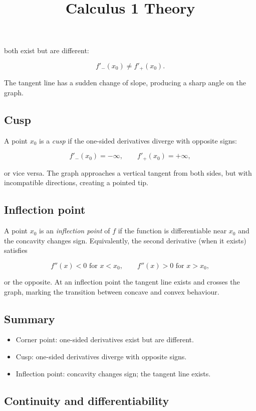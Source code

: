\documentclass[11pt,a4paper]{article} \usepackage[T1]{fontenc}
\theoremstyle{plain} \newtheorem{theorem}{Theorem} \title{Calculus 1 Theory}
\begin{document}
both exist but are different:

\[
f'_-(x_0) \neq f'_+(x_0).
\]

The tangent line has a sudden change of slope, producing a sharp angle on the
graph.

\subsection*{Cusp}

A point $x_0$ is a \emph{cusp} if the one-sided derivatives diverge with
opposite signs:

\[
f'_-(x_0) = -\infty, \qquad f'_+(x_0) = +\infty,
\]

or vice versa. The graph approaches a vertical tangent from both sides, but
with incompatible directions, creating a pointed tip.

\subsection*{Inflection point}

A point $x_0$ is an \emph{inflection point} of $f$ if the function is
differentiable near $x_0$ and the concavity changes sign. Equivalently, the
second derivative (when it exists) satisfies

\[
f''(x) < 0 \text{ for } x < x_0, \qquad f''(x) > 0 \text{ for } x > x_0,
\]

or the opposite. At an inflection point the tangent line exists and crosses the
graph, marking the transition between concave and convex behaviour.

\subsection*{Summary}

\begin{itemize}
\item Corner point: one-sided derivatives exist but are different.
\item Cusp: one-sided derivatives diverge with opposite signs.
\item Inflection point: concavity changes sign; the tangent line exists.
\end{itemize}

\subsection*{Continuity and differentiability}
\end{document}
